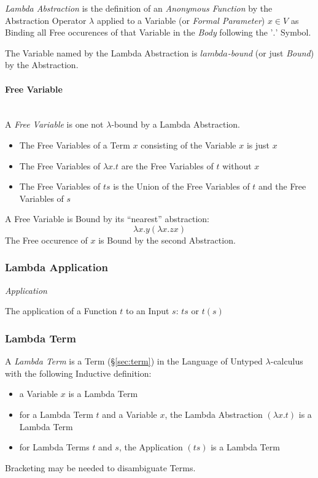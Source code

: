 \emph{Lambda Abstraction} is the definition of an \emph{Anonymous
  Function} by the Abstraction Operator $\lambda$ applied to a
Variable (or \emph{Formal Parameter}) $x \in V$ as Binding all Free
occurences of that Variable in the \emph{Body} following the '$.$'
Symbol.

The Variable named by the Lambda Abstraction is \emph{$lambda$-bound}
(or just \emph{Bound}) by the Abstraction.



\paragraph{Free Variable}\label{sec:free_variable}
\hfill \\

A \emph{Free Variable} is one not $\lambda$-bound by a Lambda
Abstraction.

\begin{itemize}
  \item The Free Variables of a Term $x$ consisting of the Variable
    $x$ is just $x$
  \item The Free Variables of $\lambda x.t$ are the Free Variables of
    $t$ without $x$
  \item The Free Variables of $ts$ is the Union of the Free Variables
    of $t$ and the Free Variables of $s$
\end{itemize}

A Free Variable is Bound by its ``nearest'' abstraction:
\[
  \lambda x.y (\lambda x.z x)
\]
The Free occurence of $x$ is Bound by the second Abstraction.



\subsubsection{Lambda Application}\label{sec:lambda_application}

\emph{Application}

The application of a Function $t$ to an Input $s$: $ts$ or $t(s)$



\subsubsection{Lambda Term}\label{sec:lambda_term}

A \emph{Lambda Term} is a Term (\S\ref{sec:term}) in the Language of
Untyped $\lambda$-calculus with the following Inductive definition:
\begin{itemize}
  \item a Variable $x$ is a Lambda Term
  \item for a Lambda Term $t$ and a Variable $x$, the Lambda
    Abstraction $(\lambda x.t)$ is a Lambda Term
  \item for Lambda Terms $t$ and $s$, the Application $(ts)$ is a
    Lambda Term
\end{itemize}
Bracketing may be needed to disambiguate Terms.


